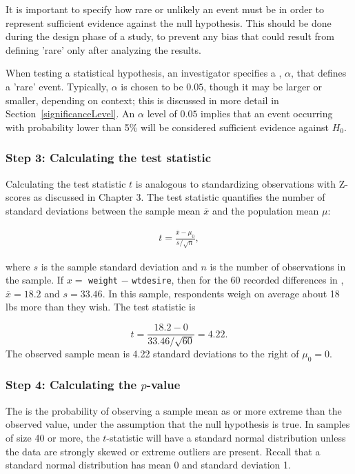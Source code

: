 It is important to specify how rare or unlikely an event must be in order to represent sufficient evidence against the null hypothesis. This should be done during the design phase of a study, to prevent any bias that could result from defining 'rare' only after analyzing the results. 

When testing a statistical hypothesis, an investigator specifies a , $\alpha$, that defines a 'rare' event. Typically, $\alpha$ is chosen to be $0.05$, though it may be larger or smaller, depending on context; this is discussed in more detail in Section~\ref{significanceLevel}. An $\alpha$ level of $0.05$ implies that an event occurring with probability lower than 5\% will be considered sufficient evidence against $H_0$.


\subsubsection{Step 3: Calculating the test statistic}

Calculating the test statistic $t$ is analogous to standardizing observations with Z-scores as discussed in Chapter 3. The test statistic quantifies the number of standard deviations between the sample mean $\overline{x}$ and the population mean $\mu$:

\begin{align*}
t=\frac{\overline{x}-\mu_0}{s/\sqrt{n}},
\end{align*}

where $s$ is the sample standard deviation and $n$ is the number of observations in the sample.  If $x =$ \texttt{weight} $-$ \texttt{wtdesire}, then for the 60 recorded differences in , $\overline{x} = 18.2$ and $s = 33.46$.  In this sample, respondents weigh on average about 18 lbs more than they wish. The test statistic is 

\[t = \frac{18.2 - 0}{33.46/\sqrt{60}} = 4.22.\]
The observed sample mean is 4.22 standard deviations to the right of $\mu_0 = 0$.

\subsubsection{Step 4: Calculating the $p$-value}

The  is the probability of observing a sample mean as or more extreme than the observed value, under the assumption that the null hypothesis is true. In samples of size 40 or more, the $t$-statistic will have a standard normal distribution unless the data are strongly skewed or extreme outliers are present. Recall that a standard normal distribution has mean 0 and standard deviation 1.

